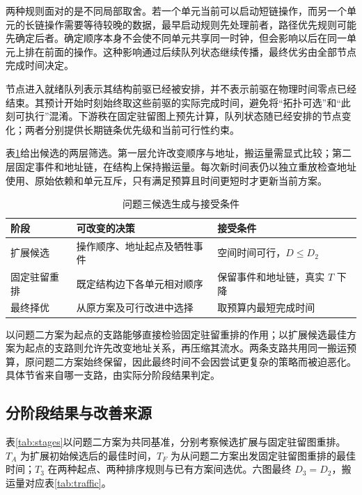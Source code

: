 两种规则面对的是不同局部取舍。若一个单元当前可以启动短链操作，而另一个单元的长链操作需要等待较晚的数据，最早启动规则先处理前者，路径优先规则可能先确定后者。确定顺序本身不会使不同单元共享同一时钟，但会影响以后在同一单元上排在前面的操作。这种影响通过后续队列状态继续传播，最终优劣由全部节点完成时间决定。

节点进入就绪队列表示其结构前驱已经被安排，并不表示前驱在物理时间零点已经结束。其预计开始时刻始终取这些前驱的实际完成时间，避免将“拓扑可选”和“此刻可执行”混淆。下游秩在固定驻留图上预先计算，队列状态随已经安排的节点变化；两者分别提供长期链条优先级和当前可行性约束。

表\ref{tab:q3steps}给出候选的两层筛选。第一层允许改变顺序与地址，搬运量需显式比较；第二层固定事件和地址链，在结构上保持搬运量。每次新时间表仍以独立重放检查地址使用、原始依赖和单元互斥，只有满足预算且时间更短时才更新当前方案。
\begin{table}[H]\centering\small
\caption{问题三候选生成与接受条件}\label{tab:q3steps}
\begin{tabular}{p{.20\linewidth}p{.36\linewidth}p{.32\linewidth}}\toprule
阶段&可改变的决策&接受条件\\\midrule
扩展候选&操作顺序、地址起点及牺牲事件&空间时间可行，$D\le D_2$\\
固定驻留重排&既定结构边下各单元相对顺序&保留事件和地址链，真实 $T$ 下降\\
最终择优&从原方案及可行改进中选择&取预算内最短完成时间\\\bottomrule
\end{tabular}\end{table}

以问题二方案为起点的支路能够直接检验固定驻留重排的作用；以扩展候选最佳方案为起点的支路则允许先改变地址关系，再压缩其流水。两条支路共用同一搬运预算，原问题二方案始终保留，因此最终时间不会因尝试更复杂的策略而被迫恶化。具体节省来自哪一支路，由实际分阶段结果判定。

\subsection{分阶段结果与改善来源}
表\ref{tab:stages}以问题二方案为共同基准，分别考察候选扩展与固定驻留图重排。$T_A$ 为扩展初始候选后的最佳时间，$T_F$ 为从问题二方案出发固定驻留图重排的最佳时间；$T_3$ 在两种起点、两种排序规则与已有方案间选优。六图最终 $D_3=D_2$，搬运量对应表\ref{tab:traffic}。
\begin{table}[H]\centering\caption{预算不增加条件下的时间对照（周期）}\label{tab:stages}\small
\end{table}

